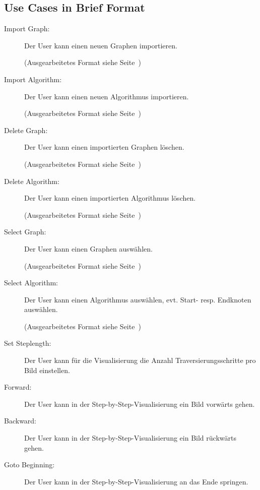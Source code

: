 \subsection{Use Cases in Brief Format}
\label{subsec:Use Cases in Brief Format}
\begin{description}
  \item[Import Graph:] Der User kann einen neuen Graphen importieren.

  (Ausgearbeitetes Format siehe Seite~\pageref{uc:Import Graph})

  \item[Import Algorithm:] Der User kann einen neuen Algorithmus importieren.

  (Ausgearbeitetes Format siehe Seite~\pageref{uc:Import Algorithm})

  \item[Delete Graph:] Der User kann einen importierten Graphen l\"oschen.

  (Ausgearbeitetes Format siehe Seite~\pageref{uc:Delete Graph})

  \item[Delete Algorithm:] Der User kann einen importierten Algorithmus l\"oschen.

  (Ausgearbeitetes Format siehe Seite~\pageref{uc:Delete Algorithm})

  \item[Select Graph:] Der User kann einen Graphen ausw\"ahlen.

  (Ausgearbeitetes Format siehe Seite~\pageref{uc:Select Graph})

  \item[Select Algorithm:] Der User kann einen Algorithmus ausw\"ahlen, evt. Start- resp. Endknoten ausw\"ahlen.

  (Ausgearbeitetes Format siehe Seite~\pageref{uc:Select Algorithm})

  \item[Set Steplength:] Der User kann f\"ur die Visualisierung die Anzahl Traversierungsschritte pro Bild einstellen.

  \item[Forward:] Der User kann in der Step-by-Step-Visualisierung ein Bild vorw\"arts gehen.

  \item[Backward:] Der User kann in der Step-by-Step-Visualisierung ein Bild r\"uckw\"arts gehen.

  \item[Goto Beginning:] Der User kann in der Step-by-Step-Visualisierung an das Ende springen.


\end{description}
